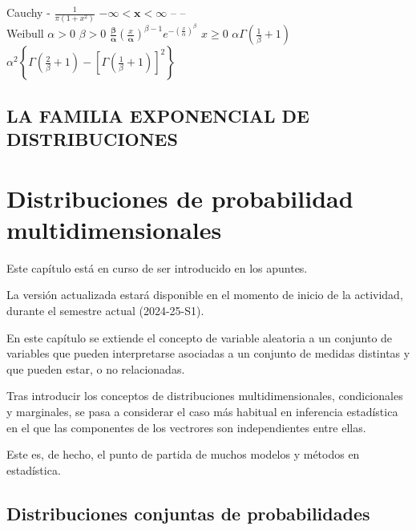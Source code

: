 \documentclass[
  a4paper,
  DIV=11,
  numbers=noendperiod]{scrreprt}
\begin{document}
Cauchy \textbar{} - \textbar{} \(\frac{1}{\pi\left(1+x^{2}\right)}\)
\(-\infty<\mathbf{x}<\infty\) \textbar{} -- \textbar{} -- \textbar{}\\
Weibull \textbar{} \(\alpha>0\) \(\beta>0\) \textbar{}
\(\frac{\boldsymbol{\beta}}{\boldsymbol{\alpha}}\left(\frac{x}{\boldsymbol{\alpha}}\right)^{\beta-1} e^{-\left(\frac{x}{\alpha}\right)^{\beta}}\)
\(x \geq 0\) \textbar{} \(\alpha \Gamma\left(\frac{1}{\beta}+1\right)\)
\textbar{}
\(\alpha^{2}\left\{\Gamma\left(\frac{2}{\beta}+1\right)-\left[\Gamma\left(\frac{1}{\beta}+1\right)\right]^{2}\right\}\)
\textbar{}

\section{LA FAMILIA EXPONENCIAL DE
DISTRIBUCIONES}\label{la-familia-exponencial-de-distribuciones}


\chapter{Distribuciones de probabilidad
multidimensionales}\label{distribuciones-de-probabilidad-multidimensionales}

Este capítulo está en curso de ser introducido en los apuntes.

La versión actualizada estará disponible en el momento de inicio de la
actividad, durante el semestre actual (2024-25-S1).

En este capítulo se extiende el concepto de variable aleatoria a un
conjunto de variables que pueden interpretarse asociadas a un conjunto
de medidas distintas y que pueden estar, o no relacionadas.

Tras introducir los conceptos de distribuciones multidimensionales,
condicionales y marginales, se pasa a considerar el caso más habitual en
inferencia estadística en el que las componentes de los vectrores son
independientes entre ellas.

Este es, de hecho, el punto de partida de muchos modelos y métodos en
estadística.

\section{Distribuciones conjuntas de
probabilidades}\label{distribuciones-conjuntas-de-probabilidades}
\end{document}
